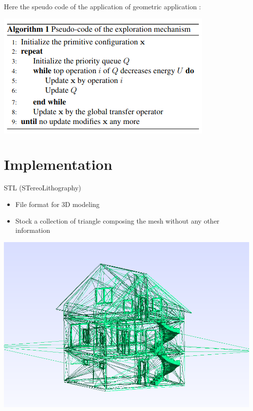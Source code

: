 \documentclass[10pt]{beamer}
\begin{document}
\begin{frame}
Here the speudo code of the application of geometric application : 
\begin{center}
    \includegraphics[scale =  0.5]{../../images/Pseudo_code_exploration.png}
  \end{center} 
\end{frame}


\section{Implementation}
\begin{frame}{STL (STereoLithography)}
    \begin{itemize}
        \item File format for 3D modeling
        \item Stock a collection of triangle composing the mesh without any other information
    \end{itemize}
    \begin{center}
        \includegraphics[scale=0.3]{../../images/ACJASMINSTL.png}
    \end{center}
\end{frame}
\end{document}
